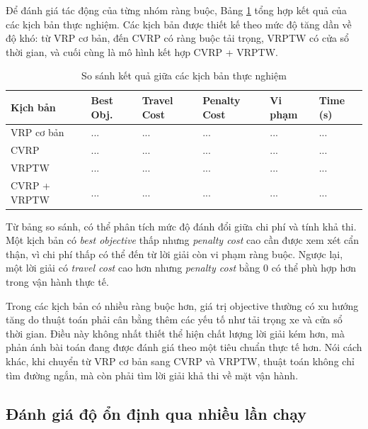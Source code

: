 \documentclass[12pt,a4paper]{article}
\numberwithin{figure}{subsection}
\begin{document}
Để đánh giá tác động của từng nhóm ràng buộc, Bảng \ref{tab:scenario_comparison} tổng hợp kết quả của các kịch bản thực nghiệm. Các kịch bản được thiết kế theo mức độ tăng dần về độ khó: từ VRP cơ bản, đến CVRP có ràng buộc tải trọng, VRPTW có cửa sổ thời gian, và cuối cùng là mô hình kết hợp CVRP + VRPTW.
\begin{table}[H]
    \centering
    \caption{So sánh kết quả giữa các kịch bản thực nghiệm}
    \label{tab:scenario_comparison}
    \renewcommand{\arraystretch}{1.35}
    \small
    \begin{tabular}{|p{2.8cm}|p{2.2cm}|p{2.2cm}|p{2.2cm}|p{1.7cm}|p{1.7cm}|}
        \hline
        \textbf{Kịch bản} &
        \textbf{Best Obj.} &
        \textbf{Travel Cost} &
        \textbf{Penalty Cost} &
        \textbf{Vi phạm} &
        \textbf{Time (s)} \\
        \hline
        VRP cơ bản & ... & ... & ... & ... & ... \\
        \hline
        CVRP & ... & ... & ... & ... & ... \\
        \hline
        VRPTW & ... & ... & ... & ... & ... \\
        \hline
        CVRP + VRPTW & ... & ... & ... & ... & ... \\
        \hline
    \end{tabular}
\end{table}

Từ bảng so sánh, có thể phân tích mức độ đánh đổi giữa chi phí và tính khả thi. Một kịch bản có \textit{best objective} thấp nhưng \textit{penalty cost} cao cần được xem xét cẩn thận, vì chi phí thấp có thể đến từ lời giải còn vi phạm ràng buộc. Ngược lại, một lời giải có \textit{travel cost} cao hơn nhưng \textit{penalty cost} bằng 0 có thể phù hợp hơn trong vận hành thực tế.

Trong các kịch bản có nhiều ràng buộc hơn, giá trị objective thường có xu hướng tăng do thuật toán phải cân bằng thêm các yếu tố như tải trọng xe và cửa sổ thời gian. Điều này không nhất thiết thể hiện chất lượng lời giải kém hơn, mà phản ánh bài toán đang được đánh giá theo một tiêu chuẩn thực tế hơn. Nói cách khác, khi chuyển từ VRP cơ bản sang CVRP và VRPTW, thuật toán không chỉ tìm đường ngắn, mà còn phải tìm lời giải khả thi về mặt vận hành.

\subsection{Đánh giá độ ổn định qua nhiều lần chạy}
\end{document}
